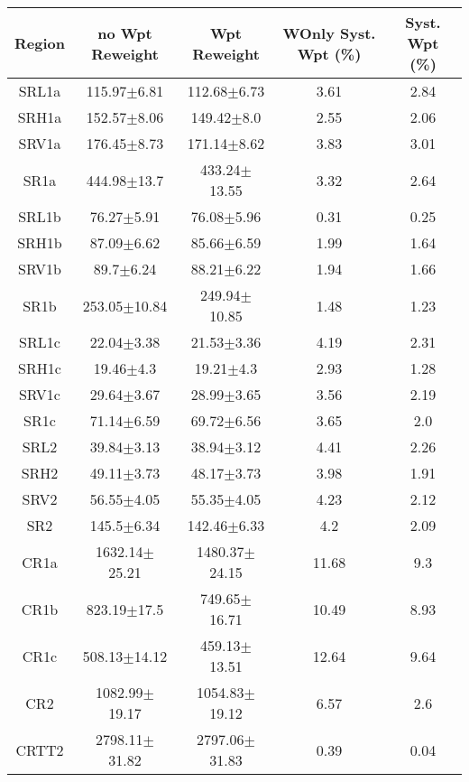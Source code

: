 \documentclass[12pt]{paper}
\begin{document}
\begin{table}[ht]\begin{center}\resizebox{\textwidth}{!}
{\begin{tabular}{c|cc|c|c}
    Region & no Wpt Reweight & Wpt Reweight & WOnly Syst. Wpt (\%) & Syst. Wpt (\%)\\ 
\hline
SRL1a & 115.97$\pm$6.81 & 112.68$\pm$6.73 & 3.61 & 2.84\\ 
SRH1a & 152.57$\pm$8.06 & 149.42$\pm$8.0 & 2.55 & 2.06\\ 
SRV1a & 176.45$\pm$8.73 & 171.14$\pm$8.62 & 3.83 & 3.01\\ 
\hline
SR1a & 444.98$\pm$13.7 & 433.24$\pm$13.55 & 3.32 & 2.64\\ 
\hline
SRL1b & 76.27$\pm$5.91 & 76.08$\pm$5.96 & 0.31 & 0.25\\ 
SRH1b & 87.09$\pm$6.62 & 85.66$\pm$6.59 & 1.99 & 1.64\\ 
SRV1b & 89.7$\pm$6.24 & 88.21$\pm$6.22 & 1.94 & 1.66\\ 
\hline
SR1b & 253.05$\pm$10.84 & 249.94$\pm$10.85 & 1.48 & 1.23\\ 
\hline
SRL1c & 22.04$\pm$3.38 & 21.53$\pm$3.36 & 4.19 & 2.31\\ 
SRH1c & 19.46$\pm$4.3 & 19.21$\pm$4.3 & 2.93 & 1.28\\ 
SRV1c & 29.64$\pm$3.67 & 28.99$\pm$3.65 & 3.56 & 2.19\\ 
\hline
SR1c & 71.14$\pm$6.59 & 69.72$\pm$6.56 & 3.65 & 2.0\\ 
\hline
SRL2 & 39.84$\pm$3.13 & 38.94$\pm$3.12 & 4.41 & 2.26\\ 
SRH2 & 49.11$\pm$3.73 & 48.17$\pm$3.73 & 3.98 & 1.91\\ 
SRV2 & 56.55$\pm$4.05 & 55.35$\pm$4.05 & 4.23 & 2.12\\ 
\hline
SR2 & 145.5$\pm$6.34 & 142.46$\pm$6.33 & 4.2 & 2.09\\ 
\hline
\hline
CR1a & 1632.14$\pm$25.21 & 1480.37$\pm$24.15 & 11.68 & 9.3\\ 
CR1b & 823.19$\pm$17.5 & 749.65$\pm$16.71 & 10.49 & 8.93\\ 
CR1c & 508.13$\pm$14.12 & 459.13$\pm$13.51 & 12.64 & 9.64\\ 
CR2 & 1082.99$\pm$19.17 & 1054.83$\pm$19.12 & 6.57 & 2.6\\ 
CRTT2 & 2798.11$\pm$31.82 & 2797.06$\pm$31.83 & 0.39 & 0.04\\ 

\end{tabular}}
\end{center}\caption*{}\end{table}
\end{document}
